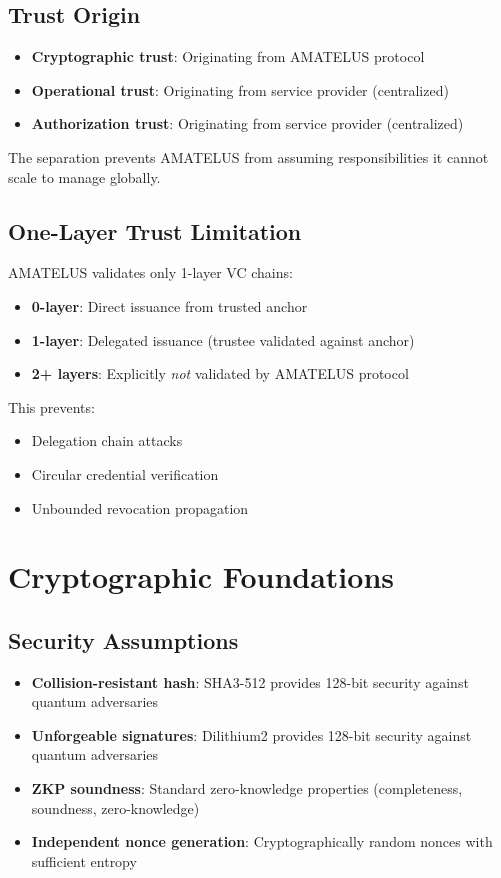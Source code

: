 \section{Trust Origin}

\begin{itemize}
  \item \textbf{Cryptographic trust}: Originating from AMATELUS protocol
  \item \textbf{Operational trust}: Originating from service provider (centralized)
  \item \textbf{Authorization trust}: Originating from service provider (centralized)
\end{itemize}

The separation prevents AMATELUS from assuming responsibilities it cannot scale to manage globally.

\section{One-Layer Trust Limitation}

AMATELUS validates only 1-layer VC chains:

\begin{itemize}
  \item \textbf{0-layer}: Direct issuance from trusted anchor
  \item \textbf{1-layer}: Delegated issuance (trustee validated against anchor)
  \item \textbf{2+ layers}: Explicitly \emph{not} validated by AMATELUS protocol
\end{itemize}

This prevents:
\begin{itemize}
  \item Delegation chain attacks
  \item Circular credential verification
  \item Unbounded revocation propagation
\end{itemize}

\chapter{Cryptographic Foundations}

\section{Security Assumptions}

\begin{itemize}
  \item \textbf{Collision-resistant hash}: SHA3-512 provides 128-bit security against quantum adversaries
  \item \textbf{Unforgeable signatures}: Dilithium2 provides 128-bit security against quantum adversaries
  \item \textbf{ZKP soundness}: Standard zero-knowledge properties (completeness, soundness, zero-knowledge)
  \item \textbf{Independent nonce generation}: Cryptographically random nonces with sufficient entropy
\end{itemize}

